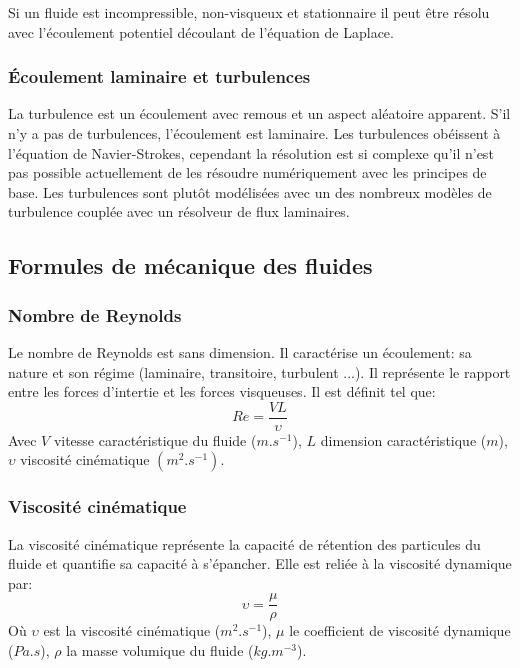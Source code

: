\documentclass[10pt,a4paper]{article}
\begin{document}
Si un fluide est incompressible, non-visqueux et stationnaire il peut être résolu avec l'écoulement potentiel découlant de l'équation de Laplace.

\subsubsection{Écoulement laminaire et turbulences}
La turbulence est un écoulement avec remous et un aspect aléatoire apparent. S'il n'y a pas de turbulences, l'écoulement est laminaire. Les turbulences obéissent à l'équation de Navier-Strokes, cependant la résolution est si complexe qu'il n'est pas possible actuellement de les résoudre numériquement avec les principes de base. Les turbulences sont plutôt modélisées avec un des nombreux modèles de turbulence couplée avec un résolveur de flux laminaires.



\subsection{Formules de mécanique des fluides}
\subsubsection{Nombre de Reynolds\cite{nbreynolds}}
Le nombre de Reynolds est sans dimension. Il caractérise un écoulement: sa nature et son régime (laminaire, transitoire, turbulent ...). Il représente le rapport entre les forces d'intertie et les forces visqueuses. Il est définit tel que:
\begin{equation}
Re = \frac{VL}{\upsilon}
\end{equation}
Avec $V$ vitesse caractéristique du fluide ($m.s^{-1}$), $L$ dimension caractéristique ($m$), $\upsilon$ viscosité cinématique $(m^{2}.s^{-1})$.

\subsubsection{Viscosité cinématique\cite{viscocinema}}
La viscosité cinématique représente la capacité de rétention des particules du fluide et quantifie sa capacité à s'épancher. Elle est reliée à la viscosité dynamique par:
\begin{equation}
\upsilon = \frac{\mu}{\rho}
\end{equation}
Où $\upsilon$ est la viscosité cinématique ($m^{2}.s^{-1}$), $\mu$ le coefficient de viscosité dynamique ($Pa.s$), $\rho$ la masse volumique du fluide ($kg.m^{-3}$).
\end{document}
